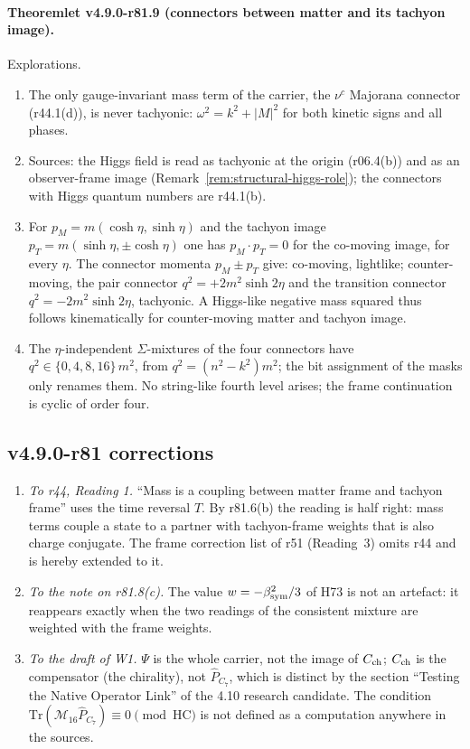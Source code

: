 \paragraph{Theoremlet v4.9.0-r81.9 (connectors between matter and its tachyon image).}
Explorations.
\begin{enumerate}[leftmargin=2em]
\item[(a)] The only gauge-invariant mass term of the carrier, the \(\nu^c\) Majorana connector (r44.1(d)), is never tachyonic:
\(\omega^2=k^2+|M|^2\) for both kinetic signs and all phases.
\item[(b)] Sources: the Higgs field is read as tachyonic at the origin (r06.4(b)) and as an observer-frame image
(Remark~\ref{rem:structural-higgs-role}); the connectors with Higgs quantum numbers are r44.1(b).
\item[(c)] For \(p_M=m(\cosh\eta,\sinh\eta)\) and the tachyon image \(p_T=m(\sinh\eta,\pm\cosh\eta)\) one has \(p_M\cdot p_T=0\) for the
co-moving image, for every \(\eta\).  The connector momenta \(p_M\pm p_T\) give: co-moving, lightlike; counter-moving, the pair connector
\(q^2=+2m^2\sinh2\eta\) and the transition connector \(q^2=-2m^2\sinh2\eta\), tachyonic.  A Higgs-like negative mass squared thus follows
kinematically for counter-moving matter and tachyon image.
\item[(d)] The \(\eta\)-independent \(\Sigma\)-mixtures of the four connectors have \(q^2\in\{0,4,8,16\}\,m^2\), from \(q^2=(n^2-k^2)m^2\);
the bit assignment of the masks only renames them.  No string-like fourth level arises; the frame continuation is cyclic of order four.
\end{enumerate}

\subsection*{v4.9.0-r81 corrections}
\label{subsec:v490-r81-corrections}

\begin{enumerate}[leftmargin=2em]
\item \emph{To r44, Reading 1.}  ``Mass is a coupling between matter frame and tachyon frame'' uses the time reversal \(T\).  By r81.6(b) the
reading is half right: mass terms couple a state to a partner with tachyon-frame weights that is also charge conjugate.  The frame
correction list of r51 (Reading~3) omits r44 and is hereby extended to it.
\item \emph{To the note on r81.8(c).}  The value \(w=-\beta_{\mathrm{sym}}^2/3\) of H73 is not an artefact: it reappears exactly when the two readings
of the consistent mixture are weighted with the frame weights.
\item \emph{To the draft of W1.}  \(\Psi\) is the whole carrier, not the image of \(C_{\rm ch}\); \(C_{\rm ch}\) is the compensator (the
chirality), not \(\hat P_{C_7}\), which is distinct by the section ``Testing the Native Operator Link'' of the 4.10 research candidate.  The condition \(\mathrm{Tr}(\mathcal M_{16}\hat P_{C_7})\equiv0
\pmod{\mathrm{HC}}\) is not defined as a computation anywhere in the sources.
\end{enumerate}

